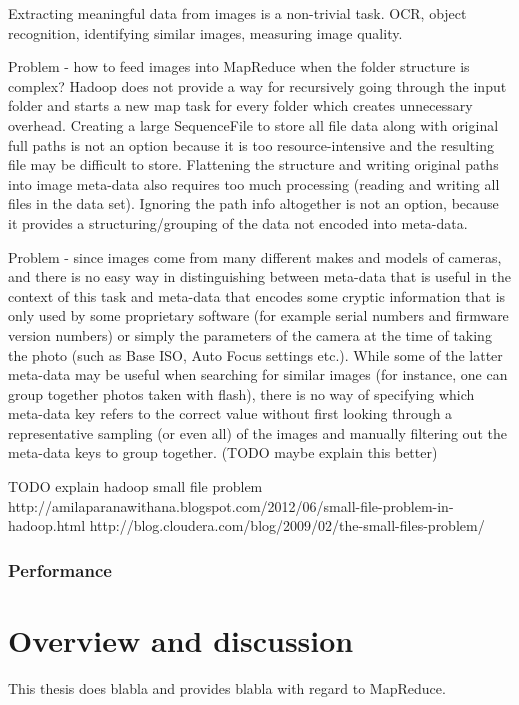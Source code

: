 \documentclass [12pt,a4paper]{report}
\begin{document}
Extracting meaningful data from images is a non-trivial task. OCR, object recognition, identifying similar images, measuring image quality.

Problem - how to feed images into MapReduce when the folder structure is complex? Hadoop does not provide a way for recursively going through the input folder and starts a new map task for every folder which creates unnecessary overhead. Creating a large SequenceFile to store all file data along with original full paths is not an option because it is too resource-intensive and the resulting file may be difficult to store. Flattening the structure and writing original paths into image meta-data also requires too much processing (reading and writing all files in the data set). Ignoring the path info altogether is not an option, because it provides a structuring/grouping of the data not encoded into meta-data.

Problem - since images come from many different makes and models of cameras, and there is no easy way in distinguishing between meta-data that is useful in the context of this task and meta-data that encodes some cryptic information that is only used by some proprietary software (for example serial numbers and firmware version numbers) or simply the parameters of the camera at the time of taking the photo (such as Base ISO, Auto Focus settings etc.). While some of the latter meta-data may be useful when searching for similar images (for instance, one can group together photos taken with flash), there is no way of specifying which meta-data key refers to the correct value without first looking through a representative sampling (or even all) of the images and manually filtering out the meta-data keys to group together. (TODO maybe explain this better)

TODO explain hadoop small file problem
http://amilaparanawithana.blogspot.com/2012/06/small-file-problem-in-hadoop.html
http://blog.cloudera.com/blog/2009/02/the-small-files-problem/

\subsection{Performance}

\chapter{Overview and discussion}

This thesis does blabla and provides blabla with regard to MapReduce. 

\clearpage
{}


\end{document}
